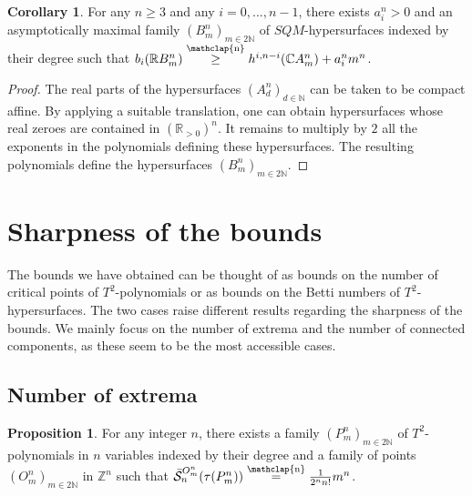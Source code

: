 \documentclass[12pt]{article}
\newcommand\customeq{\stackrel{\mathclap{\normalfont\scriptsize\mbox{n}}}{=}}
\newcommand\customgeq{\stackrel{\mathclap{\normalfont\scriptsize\mbox{n}}}{\geq}}
\newcommand{\R}{\mathbb{R}}
\newcommand{\C}{\mathbb{C}}
\newcommand{\Z}{\mathbb{Z}}
\newcommand{\N}{\mathbb{N}}
\theoremstyle{definition}
\newtheorem{prop}{Proposition}[section]
\newtheorem{cor}{Corollary}[section]
\newtheorem{rmk}{Remark}[section]
\begin{document}
\begin{cor}
    \label{cor_arnal}
    For any $n \geq 3$ and any $i = 0,...,n-1$, there exists $a_i^n > 0$ and an asymptotically maximal family $(B_m^n)_{m \in 2\N}$ of $SQM$-hypersurfaces indexed by their degree such that $b_i(\R B_m^n) \customgeq h^{i,n-i}(\C A_m^n) + a_i^n m^n$.
\end{cor}

\begin{proof}
    The real parts of the hypersurfaces $(A_d^n)_{d \in \N}$ can be taken to be compact affine. By applying a suitable translation, one can obtain hypersurfaces whose real zeroes are contained in $(\R_{>0})^n$. It remains to multiply by $2$ all the exponents in the polynomials defining these hypersurfaces. The resulting polynomials define the hypersurfaces $(B_m^n)_{m \in 2 \N}$.
\end{proof}


%

%

\section{Sharpness of the bounds}

\label{section_constructions}

\begin{sloppypar}
    The bounds we have obtained can be thought of as bounds on the number of critical points of $T^2$-polynomials or as bounds on the Betti numbers of $T^2$-hypersurfaces. The two cases raise different results regarding the sharpness of the bounds. We mainly focus on the number of extrema and the number of connected components, as these seem to be the most accessible cases.
\end{sloppypar}

\subsection{Number of extrema}

\begin{prop}
    For any integer $n$, there exists a family $(P_m^n)_{m \in 2\N}$ of $T^2$-polynomials in $n$ variables indexed by their degree and a family of points $(O_m^n)_{m \in 2\N}$ in $\Z^n$ such that $\Bar{\mathcal{S}}_n^{O_m^n}(\tau(P_m^n)) \customeq \frac{1}{2^n n!}m^n$.
\end{prop}
\end{document}
